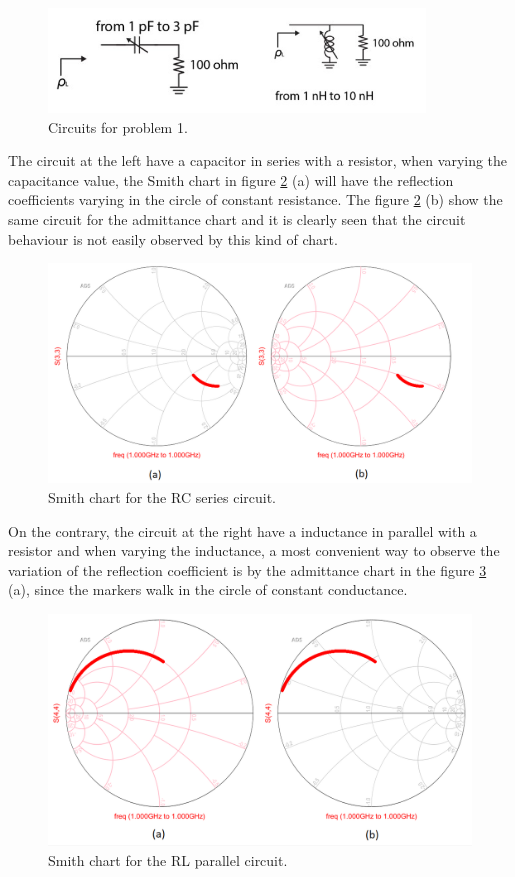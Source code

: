 \begin{figure}[H] 
\centering
\includegraphics[width=10cm]{images/cktp1.png}
\caption{Circuits for problem 1.}
\label{p1:ckts} 
\end{figure}

The circuit at the left have a capacitor in series with a resistor, when varying the capacitance value, the Smith chart in figure \ref{p1:smith2} (a) will have the reflection coefficients varying in the circle of constant resistance. The figure \ref{p1:smith2} (b) show the same circuit for the admittance chart and it is clearly seen that the circuit behaviour is not easily observed by this kind of chart. 

\begin{figure}[H] 
\centering
\includegraphics[width=15cm]{images/smith2.png}
\caption{Smith chart for the RC series circuit.}
\label{p1:smith2} 
\end{figure}

On the contrary, the circuit at the right have a inductance in parallel with a resistor and when varying the inductance, a most convenient way to observe the variation of the reflection coefficient is by the admittance chart in the figure \ref{p1:smith3} (a), since the markers walk in the circle of constant conductance.

\begin{figure}[H] 
\centering
\includegraphics[width=15cm]{images/smith3.png}
\caption{Smith chart for the RL parallel circuit.}
\label{p1:smith3} 
\end{figure}